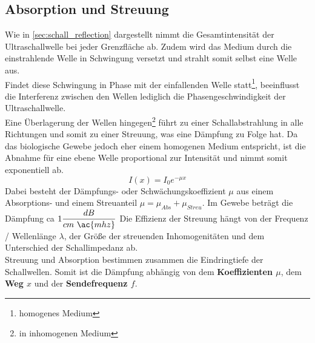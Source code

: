 \subsection{Absorption und Streuung}
Wie in \autoref{sec:schall_reflection} dargestellt nimmt die Gesamtintensität der Ultraschallwelle bei jeder Grenzfläche ab. Zudem wird das Medium durch die einstrahlende Welle in Schwingung versetzt und strahlt somit selbst eine Welle aus. \\
Findet diese Schwingung in Phase mit der einfallenden Welle statt\footnote{homogenes Medium}, beeinflusst die Interferenz zwischen den Wellen lediglich die Phasengeschwindigkeit der Ultraschallwelle.\\
Eine Überlagerung der Wellen hingegen\footnote{in inhomogenen Medium} führt zu einer Schallabstrahlung in alle Richtungen und somit zu einer Streuung, was eine Dämpfung zu Folge hat.\newline
Da das biologische Gewebe jedoch eher einem homogenen Medium entspricht, ist die Abnahme für eine ebene Welle proportional zur Intensität und nimmt somit exponentiell ab.
\begin{equation}
I(x)=I_0e^{-\mu x}\label{eq:absorbtion}
\end{equation}
Dabei besteht der Dämpfungs- oder Schwächungskoeffizient $\mu$ aus einem Absorptions- und einem Streuanteil \(\mu = \mu_{Abs}+\mu_{Streu}\). Im Gewebe beträgt die Dämpfung \ac{ca} $1\dfrac{dB}{cm\ \ac{mhz}}$ 
Die Effizienz der Streuung hängt von der Frequenz / Wellenlänge $\lambda$, der Größe der streuenden Inhomogenitäten und dem Unterschied der Schallimpedanz ab. \\
Streuung und Absorption bestimmen zusammen die Eindringtiefe der Schallwellen.
Somit ist die Dämpfung abhängig von dem \textbf{Koeffizienten \(\mu\)}, dem \textbf{Weg \(x\)} und der \textbf{Sendefrequenz \(f\)}.
%
\cite{suter2006}\cite{suter2009}\cite{suter2010}
%
